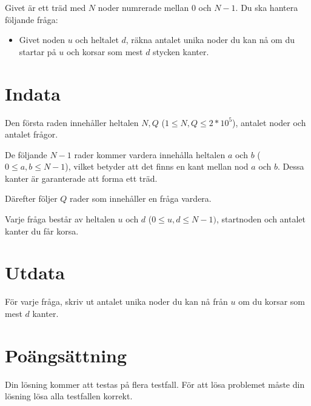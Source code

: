 Givet är ett träd med $N$ noder numrerade mellan $0$ och $N-1$. Du ska hantera följande fråga:

\begin{itemize}
    \item Givet noden $u$ och heltalet $d$, räkna antalet unika noder du kan nå om du startar på $u$ och korsar som mest $d$
    stycken kanter.
\end{itemize}


\section*{Indata}
Den första raden innehåller heltalen $N, Q$ ($1 \leq N,Q \leq 2*10^5$), antalet noder och antalet frågor.

De följande $N-1$ rader kommer vardera innehålla heltalen $a$ och $b$ ($0 \leq a,b \leq N-1$), vilket
betyder att det finns en kant mellan nod $a$ och $b$. Dessa kanter är garanterade att forma ett träd.

Därefter följer $Q$ rader som innehåller en fråga vardera. 

Varje fråga består av heltalen $u$ och $d$ ($0 \leq u,d \leq N-1)$, startnoden och antalet kanter du får korsa.

\section*{Utdata}
För varje fråga, skriv ut antalet unika noder du kan nå från $u$ om du korsar som mest $d$ kanter.

\section*{Poängsättning}
Din lösning kommer att testas på flera testfall.
\noindent
För att lösa problemet måste din lösning lösa alla testfallen korrekt.
